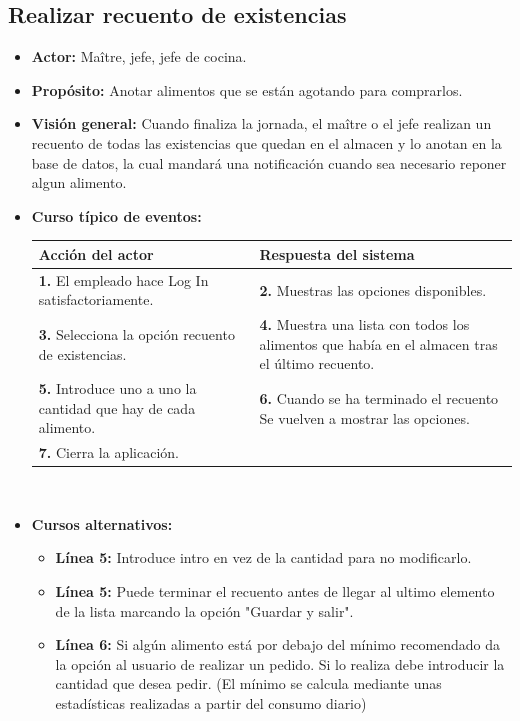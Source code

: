 \documentclass[spanish,a4paper,12pt]{report}	%
\begin{document}
	\subsection{Realizar recuento de existencias}
			\begin{itemize}
			\item \textbf{Actor:} Maître, jefe, jefe de cocina.
			\item \textbf{Propósito: } Anotar alimentos que se están agotando para comprarlos.
			\item \textbf{Visión general:} Cuando finaliza la jornada, el maître o el jefe realizan un recuento de todas las existencias que quedan en el almacen y lo anotan en la base de datos, la cual mandará una notificación cuando sea necesario reponer algun alimento.
			\item \textbf{Curso típico de eventos:} 	\\
				\begin{tabular}{|p{6cm}||p{6cm}|}
				\hline
				\textbf{Acción del actor} & \textbf{Respuesta del sistema} \\ \hline
				\textbf{1.} El empleado hace Log In satisfactoriamente. & \textbf{2.} Muestras las opciones disponibles. \\ \hline
				\textbf{3.} Selecciona la opción recuento de existencias. & \textbf{4.} Muestra una lista con todos los alimentos que había en el almacen tras el último recuento. \\ \hline
				\textbf{5.} Introduce uno a uno la cantidad que hay de cada alimento. & \textbf{6.} Cuando se ha terminado el recuento Se vuelven a mostrar las opciones. \\ \hline
				\textbf{7.}  Cierra la aplicación. &   \\ \hline
			\end{tabular}
			\\
			\item \textbf{Cursos alternativos:} 
			\begin{itemize}
			\item  \textbf{Línea 5:} Introduce intro en vez de la cantidad para no modificarlo.
			\item  \textbf{Línea 5:} Puede terminar el recuento antes de llegar al ultimo elemento de la lista marcando la opción "Guardar y salir".
			\item  \textbf{Línea 6:} Si algún alimento está por debajo del mínimo recomendado da la opción al usuario de realizar un pedido. Si lo realiza debe introducir la cantidad que desea pedir. (El mínimo se calcula mediante unas estadísticas realizadas a partir del consumo diario)
			\end {itemize}
		\end {itemize}
\end{document}
